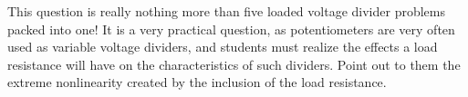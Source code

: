 
This question is really nothing more than five loaded voltage divider problems packed into one!  It is a very practical question, as potentiometers are very often used as variable voltage dividers, and students must realize the effects a load resistance will have on the characteristics of such dividers.  Point out to them the extreme nonlinearity created by the inclusion of the load resistance.




